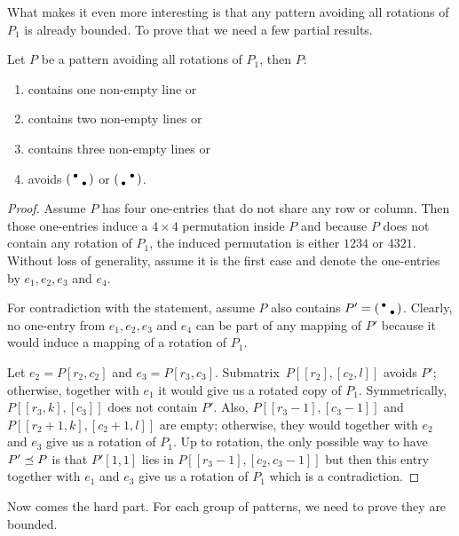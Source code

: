 What makes it even more interesting is that any pattern avoiding all rotations of $P_1$ is already bounded. To prove that we need a few partial results.
\begin{thm}
\label{thm:boundedints}
Let $P$ be a pattern avoiding all rotations of $P_1$, then $P$:
\begin{enumerate}
	\item contains one non-empty line or
	\item contains two non-empty lines or
	\item contains three non-empty lines or
	\item avoids $\left(\begin{smallmatrix}\bullet& \\ &\bullet\end{smallmatrix}\right)$ or $\left(\begin{smallmatrix} &\bullet\\\bullet& \end{smallmatrix}\right)$.
\end{enumerate}
\end{thm}
\begin{proof}
Assume $P$ has four one-entries that do not share any row or column. Then those one-entries induce a $4\times4$ permutation inside $P$ and because $P$ does not contain any rotation of $P_1$, the induced permutation is either $1234$ or $4321$. Without loss of generality, assume it is the first case and denote the one-entries by $e_1,e_2,e_3$ and $e_4$.

For contradiction with the statement, assume $P$ also contains $P'=\left(\begin{smallmatrix}\bullet& \\ &\bullet\end{smallmatrix}\right)$. Clearly, no one-entry from $e_1,e_2,e_3$ and $e_4$ can be part of any mapping of $P'$ because it would induce a mapping of a rotation of $P_1$.

Let $e_2=P[r_2,c_2]$ and $e_3=P[r_3,c_3]$. Submatrix~$P[[r_2],[c_2,l]]$ avoids $P'$; otherwise, together with $e_1$ it would give us a rotated copy of $P_1$. Symmetrically, $P[[r_3,k],[c_3]]$ does not contain $P'$. Also, $P[[r_3-1],[c_3-1]]$ and $P[[r_2+1,k],[c_2+1,l]]$ are empty; otherwise, they would together with $e_2$ and $e_3$ give us a rotation of $P_1$. Up to rotation, the only possible way to have $P'\preceq P$ is that $P'[1,1]$ lies in $P[[r_3-1],[c_2,c_3-1]]$ but then this entry together with $e_1$ and $e_3$ give us a rotation of $P_1$ which is a contradiction.
\end{proof}

Now comes the hard part. For each group of patterns, we need to prove they are bounded.

